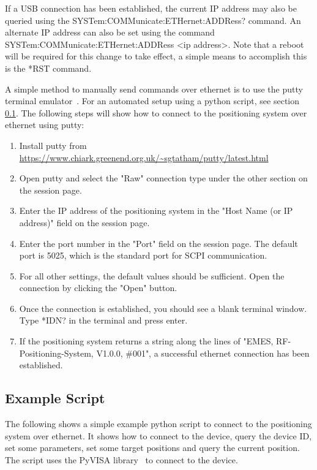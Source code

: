 If a USB connection has been established, the current IP address may also be queried using the SYSTem:COMMunicate:ETHernet:ADDRess? command. An alternate IP address can also be set using the command SYSTem:COMMunicate:ETHernet:ADDRess <ip address>. Note that a reboot will be required for this change to take effect, a simple means to accomplish this is the *RST command.

A simple method to manually send commands over ethernet is to use the putty terminal emulator~\cite{simon_tatham_download_2025}. For an automated setup using a python script, see section \ref{sec:example_script}. The following steps will show how to connect to the positioning system over ethernet using putty:

\begin{enumerate}
    \item Install putty from \url{https://www.chiark.greenend.org.uk/~sgtatham/putty/latest.html}
    \item Open putty and select the "Raw" connection type under the other section on the session page.
    \item Enter the IP address of the positioning system in the "Host Name (or IP address)" field on the session page.
    \item Enter the port number in the "Port" field on the session page. The default port is 5025, which is the standard port for SCPI communication.
    \item For all other settings, the default values should be sufficient. Open the connection by clicking the "Open" button.
    \item Once the connection is established, you should see a blank terminal window. Type *IDN? in the terminal and press enter.
    \item If the positioning system returns a string along the lines of "EMES, RF-Positioning-System, V1.0.0, \#001", a successful ethernet connection has been established.
    
\end{enumerate}

\subsection{Example Script} \label{sec:example_script}
The following shows a simple example python script to connect to the positioning system over ethernet. It shows how to connect to the device, query the device ID, set some parameters, set some target positions and query the current position. The script uses the PyVISA library~\cite{pyvisa_authors_pyvisa_2025} to connect to the device.

